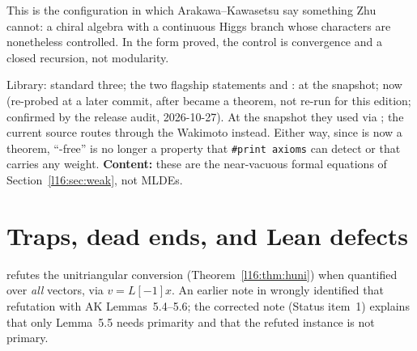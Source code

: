 \begin{physics}
This is the configuration in which Arakawa--Kawasetsu say something Zhu cannot: a chiral algebra with a continuous Higgs
branch whose characters are nonetheless controlled. In the form proved, the control is convergence and a closed recursion,
not modularity.
\end{physics}

\begin{status}
Library: \allowbreak{}\allowbreak{}\allowbreak{}\allowbreak{}\allowbreak{} standard three; the two  flagship
statements \allowbreak{}\allowbreak{} and \allowbreak{}\allowbreak{}\allowbreak{}\allowbreak{}\allowbreak{}:
\lean{[propext, Classical.}\allowbreak{}\allowbreak{}\allowbreak\lean{pbw]} at the snapshot;
now  (re-probed at a later commit, after  became a theorem, not re-run for this edition; confirmed by the release audit,
2026-10-27). At the snapshot they used  via \allowbreak{}\allowbreak{}; the
current source routes \allowbreak{}\allowbreak{}\allowbreak{} through the Wakimoto
\allowbreak{}\allowbreak{}\allowbreak{} instead. Either way, since  is now a
theorem, ``-free'' is no longer a property that \texttt{\#print axioms} can detect or that carries any weight.
\textbf{Content:} these are the near-vacuous formal equations of Section~\ref{l16:sec:weak}, not MLDEs.
\end{status}

\section{Traps, dead ends, and Lean defects}\label{l16:sec:defects}

\begin{warning}[title={Primarity is essential in Lemma 5.5 (recorded dead end)}]
 refutes the unitriangular conversion
(Theorem~\ref{l16:thm:huni}) when quantified over \emph{all} vectors, via $v = L[-1]x$. An earlier note in
 wrongly identified that refutation with AK Lemmas~5.4--5.6; the corrected note (Status item~1)
explains that only Lemma~5.5 needs primarity and that the refuted instance is not primary.
\end{warning}

